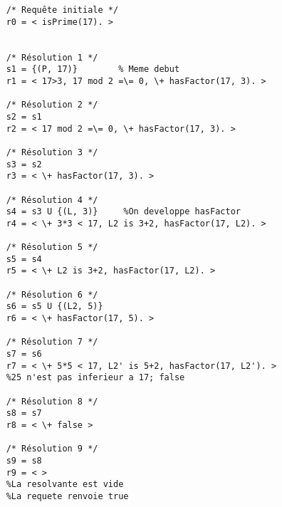     \begin{lstlisting}
    /* Requête initiale */
    r0 = < isPrime(17). >
    
    
    /* Résolution 1 */
    s1 = {(P, 17)}        % Meme debut           
    r1 = < 17>3, 17 mod 2 =\= 0, \+ hasFactor(17, 3). >
    
    /* Résolution 2 */
    s2 = s1
    r2 = < 17 mod 2 =\= 0, \+ hasFactor(17, 3). >
    
    /* Résolution 3 */
    s3 = s2
    r3 = < \+ hasFactor(17, 3). >
    
    /* Résolution 4 */
    s4 = s3 U {(L, 3)}     %On developpe hasFactor
    r4 = < \+ 3*3 < 17, L2 is 3+2, hasFactor(17, L2). >
    
    /* Résolution 5 */
    s5 = s4
    r5 = < \+ L2 is 3+2, hasFactor(17, L2). >
    
    /* Résolution 6 */
    s6 = s5 U {(L2, 5)}
    r6 = < \+ hasFactor(17, 5). >
    
    /* Résolution 7 */  
    s7 = s6   
    r7 = < \+ 5*5 < 17, L2' is 5+2, hasFactor(17, L2'). >
    %25 n'est pas inferieur a 17; false
    
    /* Résolution 8 */
    s8 = s7   
    r8 = < \+ false >
    
    /* Résolution 9 */
    s9 = s8   
    r9 = < >
    %La resolvante est vide 
    %La requete renvoie true
    \end{lstlisting}

